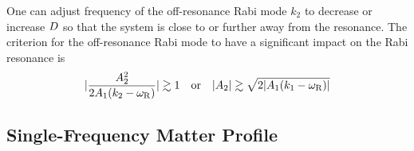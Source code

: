 One can adjust frequency of the off-resonance Rabi mode $k_2$ to decrease or increase $D$ so that the system is close to or further away from the resonance. The criterion for the off-resonance Rabi mode to have a significant impact on the Rabi resonance is
\begin{equation}
    \lvert  \frac{ A_2^2 }{2  A_1 ( k_2 - \omega_{\mathrm R})} \rvert \gtrsim 1 \quad \text{or} \quad \lvert A_2\rvert \gtrsim \sqrt{ 2 \lvert A_1 (k_1 - \omega_\RR) \rvert }
    \label{chap:matter-sec:single-frequency-eqn:criterion-for-a2}
\end{equation}



\subsection{\label{chap:matter-sec:single-frequency-matter-profile}Single-Frequency Matter Profile}


